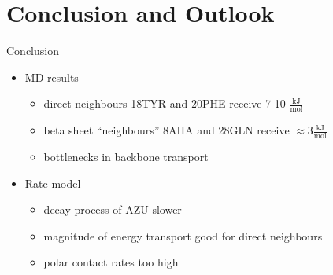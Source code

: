 \section{Conclusion and Outlook}

\begin{frame}[c]{Conclusion}
  \begin{itemize}
    \item MD results
      \begin{itemize}
        \item direct neighbours 18TYR and 20PHE receive 7-10 $\frac{\text{kJ}}{\text{mol}}$
        \item beta sheet ``neighbours'' 8AHA and 28GLN receive $\approx 3\frac{\text{kJ}}{\text{mol}}$ 
        \item bottlenecks in backbone transport
      \end{itemize}
      \vspace{5mm}
      \item Rate model
        \begin{itemize}
          \item decay process of AZU slower
          \item magnitude of energy transport good for direct neighbours
          \item polar contact rates too high
        \end{itemize}
  \end{itemize}   
\end{frame}


